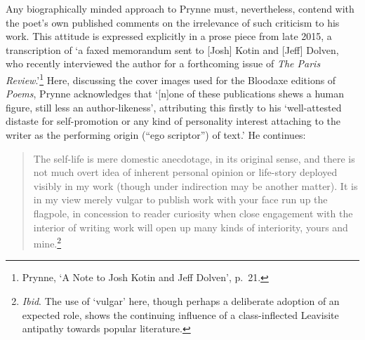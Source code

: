 \documentclass[]{article}
\begin{document}
Any biographically minded approach to Prynne must, nevertheless, contend
with the poet's own published comments on the irrelevance of such
criticism to his work. This attitude is expressed explicitly in a prose
piece from late 2015, a transcription of `a faxed memorandum sent to
{[}Josh{]} Kotin and {[}Jeff{]} Dolven, who recently interviewed the
author for a forthcoming issue of \emph{The Paris Review}.'\footnote{Prynne,
  `A Note to Josh Kotin and Jeff Dolven', p.~21.} Here, discussing the
cover images used for the Bloodaxe editions of \emph{Poems}, Prynne
acknowledges that `{[}n{]}one of these publications shews a human
figure, still less an author-likeness', attributing this firstly to his
`well-attested distaste for self-promotion or any kind of personality
interest attaching to the writer as the performing origin (``ego
scriptor'') of text.' He continues:

\begin{quote}
The self-life is mere domestic anecdotage, in its original sense, and
there is not much overt idea of inherent personal opinion or life-story
deployed visibly in my work (though under indirection may be another
matter). It is in my view merely vulgar to publish work with your face
run up the flagpole, in concession to reader curiosity when close
engagement with the interior of writing work will open up many kinds of
interiority, yours and mine.\footnote{\emph{Ibid}. The use of `vulgar'
  here, though perhaps a deliberate adoption of an expected role, shows
  the continuing influence of a class-inflected Leavisite antipathy
  towards popular literature.}
\end{quote}
\end{document}
